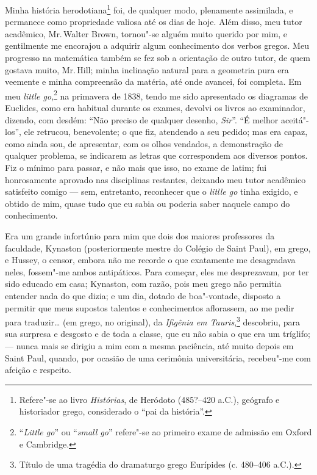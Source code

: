 Minha história herodotiana\footnote{Refere"-se ao livro
  \textit{Histórias}, de Heródoto (485?--420 a.C.), geógrafo e historiador
  grego, considerado o ``pai da história''.} foi, de
qualquer modo, plenamente assimilada, e permanece como propriedade
valiosa até os dias de hoje. Além disso, meu tutor acadêmico, Mr.\,Walter
Brown, tornou"-se alguém muito querido por mim, e gentilmente me
encorajou a adquirir algum conhecimento dos verbos gregos. Meu progresso
na matemática também se fez sob a orientação de outro tutor, de quem
gostava muito, Mr.\,Hill; minha inclinação natural para a geometria pura
era veemente e minha compreensão da matéria, até onde avancei, foi
completa. Em meu \textit{little go},\footnote{``\textit{Little go}'' ou
  ``\textit{small go}'' refere"-se ao primeiro exame de admissão em Oxford
  e Cambridge.} na primavera de 1838, tendo me sido
apresentado os diagramas de Euclides, como era habitual durante os
exames, devolvi os livros ao examinador, dizendo, com desdém: ``Não
preciso de qualquer desenho, \textit{Sir}''. ``É melhor aceitá"-los'', ele
retrucou, benevolente; o que fiz, atendendo a seu pedido; mas era capaz,
como ainda sou, de apresentar, com os olhos vendados, a demonstração de
qualquer problema, se indicarem as letras que correspondem aos diversos
pontos. Fiz o mínimo para passar, e não mais que isso, no exame de
latim; fui honrosamente aprovado nas disciplinas restantes, deixando meu
tutor acadêmico satisfeito comigo --- sem, entretanto, reconhecer que o
\textit{litlle go} tinha exigido, e obtido de mim, quase tudo que eu
sabia ou poderia saber naquele campo do conhecimento.

Era um grande infortúnio para mim que dois dos maiores professores
da faculdade, Kynaston (posteriormente mestre do Colégio de Saint Paul),
em grego, e Hussey, o censor, embora não me recorde o que exatamente me
desagradava neles, fossem"-me ambos antipáticos. Para começar, eles me
desprezavam, por ter sido educado em casa; Kynaston, com razão, pois meu
grego não permitia entender nada do que dizia; e um dia, dotado de
boa"-vontade, disposto a permitir que meus supostos talentos e
conhecimentos aflorassem, ao me pedir para traduzir\ldots{} (em grego, no
original), da \textit{Ifigênia em Tauris},\footnote{Título de uma tragédia
  do dramaturgo grego Eurípides (c. 480--406 a.C.).} descobriu, para sua surpresa e desgosto e de toda a classe,
que eu não sabia o que era um tríglifo; --- nunca mais se dirigiu a mim
com a mesma paciência, até muito depois em Saint Paul, quando, por
ocasião de uma cerimônia universitária, recebeu"-me com afeição e
respeito.

